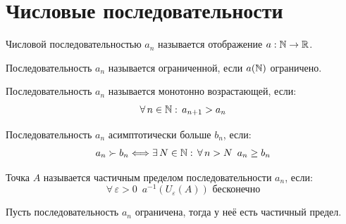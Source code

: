 \documentclass[12pt]{article}
\begin{document}
\section{Числовые последовательности}

\begin{definition}
    Числовой последовательностью $a_n$ называется отображение $a:\mathbb{N} \to \mathbb{R}$.
\end{definition}
\begin{definition}
    Последовательность $a_n$ называется ограниченной, если $a(\mathbb{N})$ ограничено. 
\end{definition}
\begin{definition}
    Последовательность $a_n$ называется монотонно возрастающей, если:
    $$\forall\, n \in \mathbb{N}:\, a_{n+1}>a_n$$
\end{definition}
\begin{definition}
    Последовательность $a_n$ асимптотически больше $b_n$, если:
    $$a_n\succ b_n\Longleftrightarrow\exists\, N\in \mathbb{N}:\,\forall\,n>N\enspace a_n\geq b_n$$
\end{definition}
\begin{definition}
    Точка $A$ называется частичным пределом последовательности $a_n$, если:
    $$\forall\,\varepsilon>0\enspace a^{-1}(U_\varepsilon(A))\text{ бесконечно}$$
\end{definition}
\begin{theorem}
    Пусть последовательность $a_n$ ограничена, тогда у неё есть частичный предел.
\end{theorem}
\end{document}
